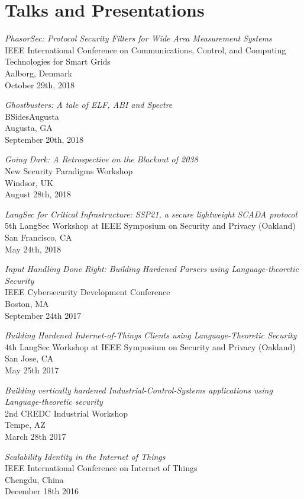\documentclass[letterpaper,10pt]{article}
\renewenvironment{itemize}{
	\begin{list}{}{
			\setlength{\leftmargin}{1.5em}
		}
	}{
	\end{list}
}
\begin{document}
\section*{Talks and Presentations}
\begin{itemize}
	\setlength\itemsep{0ex}
	\item \textit{PhasorSec: Protocol Security Filters for Wide Area Measurement Systems} \\ IEEE International Conference on Communications, Control, and Computing Technologies for Smart Grids \\ Aalborg, Denmark \\ October 29th, 2018
	\item \textit{Ghostbusters: A tale of ELF, ABI and Spectre} \\ BSidesAugusta\\ Augusta, GA \\ September 20th, 2018
	\item \textit{Going Dark: A Retrospective on the Blackout of 2038} \\ New Security Paradigms Workshop \\ Windsor, UK \\ August 28th, 2018
	\item \textit{LangSec for Critical Infrastructure: SSP21, a secure lightweight SCADA protocol} \\ 5th LangSec Workshop at IEEE Symposium on Security and Privacy (Oakland)\\ San Francisco, CA\\ May 24th, 2018
	\item \textit{Input Handling Done Right: Building Hardened Parsers using Language-theoretic Security} \\ IEEE Cybersecurity Development Conference\\ Boston, MA\\ September 24th 2017
	\item \textit{Building Hardened Internet-of-Things Clients using Language-Theoretic Security}\\ 4th LangSec Workshop at IEEE Symposium on Security and Privacy (Oakland)\\ San Jose, CA\\ May 25th 2017
	\item \textit{Building vertically hardened Industrial-Control-Systems applications using Language-theoretic security}\\ 2nd CREDC Industrial Workshop\\ Tempe, AZ\\ March 28th 2017
	\item \textit{Scalability Identity in the Internet of Things}\\ IEEE International Conference on Internet of Things\\ Chengdu, China\\ December 18th 2016
\end{itemize}
\end{document}
